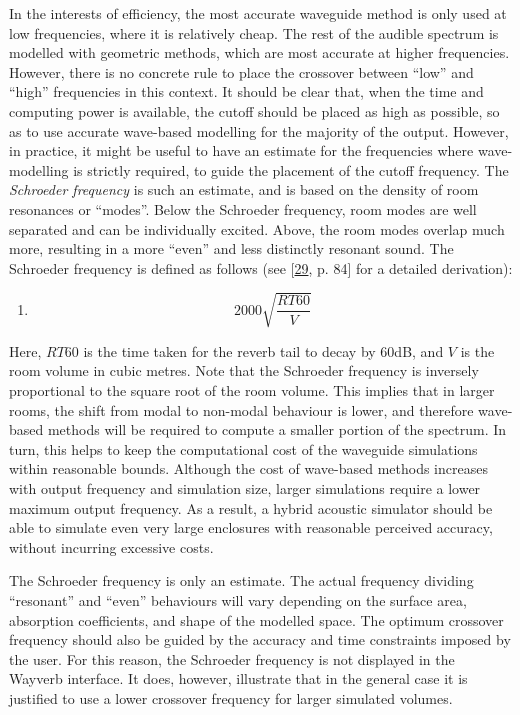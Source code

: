 \documentclass[]{scrreprt}
\providecommand{\tightlist}{%
  \setlength{\itemsep}{0pt}\setlength{\parskip}{0pt}}
\begin{document}
In the interests of efficiency, the most accurate waveguide method is
only used at low frequencies, where it is relatively cheap. The rest of
the audible spectrum is modelled with geometric methods, which are most
accurate at higher frequencies. However, there is no concrete rule to
place the crossover between ``low'' and ``high'' frequencies in this
context. It should be clear that, when the time and computing power is
available, the cutoff should be placed as high as possible, so as to use
accurate wave-based modelling for the majority of the output. However,
in practice, it might be useful to have an estimate for the frequencies
where wave-modelling is strictly required, to guide the placement of the
cutoff frequency. The \emph{Schroeder frequency} is such an estimate,
and is based on the density of room resonances or ``modes''. Below the
Schroeder frequency, room modes are well separated and can be
individually excited. Above, the room modes overlap much more, resulting
in a more ``even'' and less distinctly resonant sound. The Schroeder
frequency is defined as follows (see
{[}\protect\hyperlink{ref-kuttruffux5froomux5f2009}{29}, p. 84{]} for a
detailed derivation):

\begin{enumerate}
\def\labelenumi{(\arabic{enumi})}
\setcounter{enumi}{25}
\tightlist
\item
  \[2000\sqrt{\frac{RT60}{V}}\]
\end{enumerate}

Here, \(RT60\) is the time taken for the reverb tail to decay by 60dB,
and \(V\) is the room volume in cubic metres. Note that the Schroeder
frequency is inversely proportional to the square root of the room
volume. This implies that in larger rooms, the shift from modal to
non-modal behaviour is lower, and therefore wave-based methods will be
required to compute a smaller portion of the spectrum. In turn, this
helps to keep the computational cost of the waveguide simulations within
reasonable bounds. Although the cost of wave-based methods increases
with output frequency and simulation size, larger simulations require a
lower maximum output frequency. As a result, a hybrid acoustic simulator
should be able to simulate even very large enclosures with reasonable
perceived accuracy, without incurring excessive costs.

The Schroeder frequency is only an estimate. The actual frequency
dividing ``resonant'' and ``even'' behaviours will vary depending on the
surface area, absorption coefficients, and shape of the modelled space.
The optimum crossover frequency should also be guided by the accuracy
and time constraints imposed by the user. For this reason, the Schroeder
frequency is not displayed in the Wayverb interface. It does, however,
illustrate that in the general case it is justified to use a lower
crossover frequency for larger simulated volumes.
\end{document}
